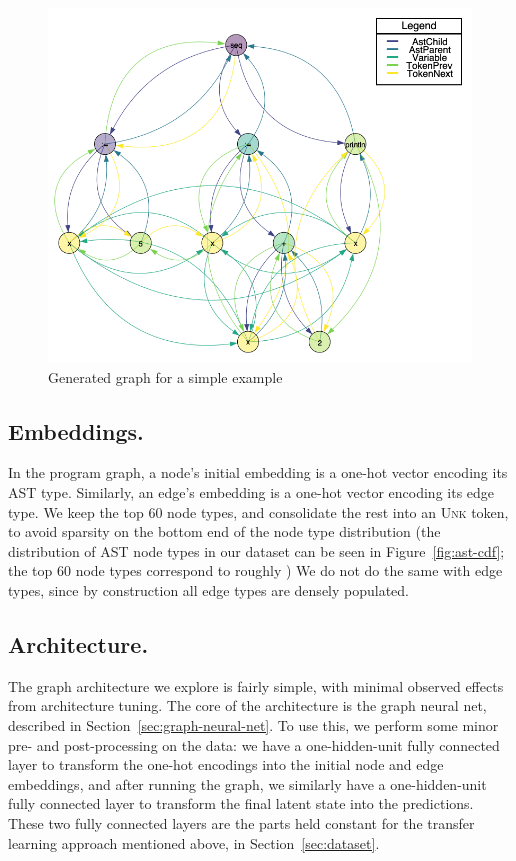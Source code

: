 \begin{figure}
  \centering
  \includegraphics[width=\linewidth]{img/gen_graph}
  \caption{Generated graph for a simple example}
  \label{fig:ast-graph}
\end{figure}

\subsection{Embeddings.}

In the program graph, a node's initial embedding is a one-hot vector encoding its AST type.
Similarly, an edge's embedding is a one-hot vector encoding its edge type.
We keep the top 60 node types, and consolidate the rest into an \textsc{Unk} token, to avoid sparsity on the bottom end of the node type distribution (the distribution of AST node types in our dataset can be seen in Figure~\ref{fig:ast-cdf}; the top 60 node types correspond to roughly )
We do not do the same with edge types, since by construction all edge types are densely populated.

\subsection{Architecture.}

The graph architecture we explore is fairly simple, with minimal observed effects from architecture tuning.
The core of the architecture is the graph neural net, described in Section~\ref{sec:graph-neural-net}.
To use this, we perform some minor pre- and post-processing on the data: we have a one-hidden-unit fully connected layer to transform the one-hot encodings into the initial node and edge embeddings, and after running the graph, we similarly have a one-hidden-unit fully connected layer to transform the final latent state into the predictions.
These two fully connected layers are the parts held constant for the transfer learning approach mentioned above, in Section~\ref{sec:dataset}.

